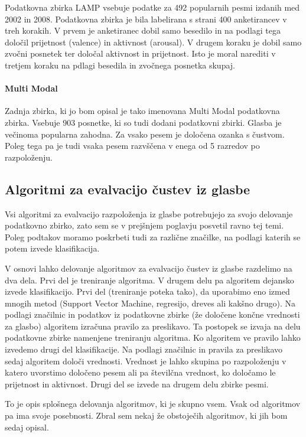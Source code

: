 \documentclass[a4paper, 12pt]{book}
\begin{document}
{Podatkovna zbirka LAMP \cite{chu2010lamp} vsebuje podatke za 492 popularnih pesmi izdanih med 2002 in 2008. Podatkovna zbirka je bila labelirana s strani 400 anketirancev v treh korakih. V prvem je anketiranec dobil samo besedilo in  na podlagi tega določil prijetnost (valence) in aktivnost (arousal). V drugem koraku je dobil samo zvočni posnetek ter določal aktivnost in prijetnost. Isto je moral narediti v tretjem koraku na pdlagi besedila in zvočnega posnetka skupaj. 

\paragraph{Multi Modal}

Zadnja zbirka, ki jo bom opisal je tako imenovana Multi Modal \cite{panda2013multi} podatkovna zbirka. Vsebuje 903 posnetke, ki so tudi dodani podatkovni zbirki. Glasba je večinoma popularna zahodna. Za vsako pesem je določena ozanka s čustvom. Poleg tega pa je tudi vsaka pesem razvščena v enega od 5 razredov po razpoloženju. 

\subsection{Algoritmi za evalvacijo čustev iz glasbe} 

Vsi algoritmi za evalvacijo razpoloženja iz glasbe potrebujejo za svojo delovanje podatkovno zbirko, zato sem se v prejšnjem poglavju posvetil ravno tej temi. Poleg podtakov moramo poskrbeti tudi za različne značilke, na podlagi katerih se potem izvede klasifikacija. 

V osnovi lahko delovanje algoritmov za evalvacijo čustev iz glasbe razdelimo na dva dela. Prvi del je treniranje algoritma. V drugem delu pa algoritem dejansko izvede klasifikacijo. Prvi del (treniranje poteka tako), da uporabimo eno izmed mnogih metod (Support Vector Machine, regresijo, dreves ali kakšno drugo). Na podlagi značilnic in podatkov iz podatkovne zbirke (že določene končne vrednosti za glasbo) algoritem izračuna pravilo za preslikavo. Ta postopek se izvaja na delu podatkovne zbirke namenjene treniranju algoritma. Ko algoritem ve pravilo lahko izvedemo drugi del klasifikacije. Na podlagi značilnic in pravila za preslikavo sedaj algoritem določi vrednosti. Vrednost je lahko skupina po razpoloženju v katero uvorstimo določeno pesem ali pa številčna vrednost, ko določamo le prijetnost in aktivnost. Drugi del se izvede na drugem delu zbirke pesmi. 

To je opis splošnega delovanja algoritmov, ki je skupno vsem. Vsak od algoritmov pa ima svoje posebnosti. Zbral sem nekaj že obstoječih algoritmov, ki jih bom sedaj opisal.

}
\end{document}

